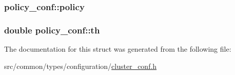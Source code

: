 \subsubsection[{\texorpdfstring{policy}{policy}}]{ policy\+\_\+conf\+::policy}\hypertarget{structpolicy__conf_a13b8139b6bbca7153bc2890f8941c3d4}{}\label{structpolicy__conf_a13b8139b6bbca7153bc2890f8941c3d4}
\subsubsection[{\texorpdfstring{th}{th}}]{\setlength{\rightskip}{0pt plus 5cm}double policy\+\_\+conf\+::th}\hypertarget{structpolicy__conf_ad9e739dbfec746ae19a5e688062076d5}{}\label{structpolicy__conf_ad9e739dbfec746ae19a5e688062076d5}


The documentation for this struct was generated from the following file\+:\begin{DoxyCompactItemize}
\item 
src/common/types/configuration/\hyperlink{cluster__conf_8h}{cluster\+\_\+conf.\+h}\end{DoxyCompactItemize}
